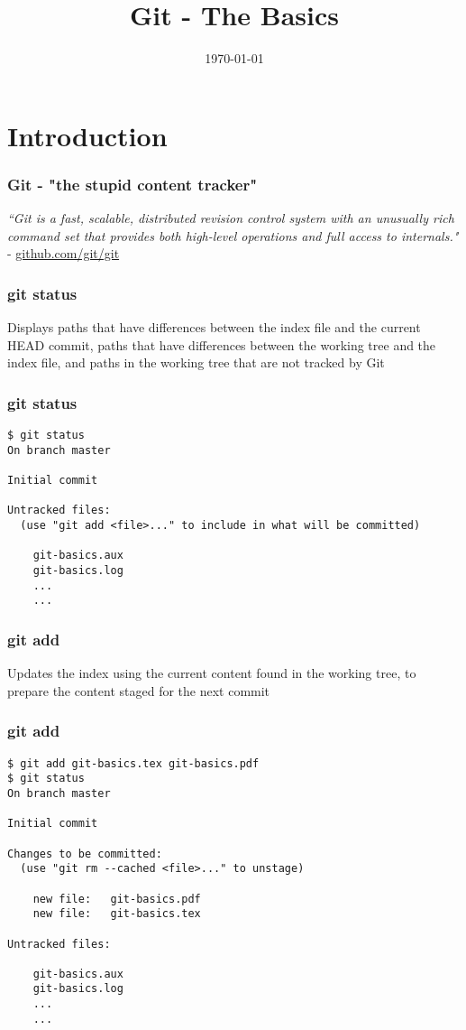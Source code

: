 \documentclass{beamer}
\title[Git]{Git - The Basics} %
\author{} %
\institute[] %
{
 \\ %
\medskip
\textit{chris@cjwfuller.com}
}
\date{\today}
\begin{document}
\begin{frame}
\titlepage
\end{frame}

\section{Introduction}

\begin{frame}
\frametitle{Git - "the stupid content tracker"}
\textit{``Git is a fast, scalable, distributed revision control system with an unusually rich command set that provides both high-level operations and full access to internals."} - \url{github.com/git/git}
\end{frame}


\begin{frame}
\frametitle{git status}
Displays paths that have differences between the index file and the current HEAD commit, paths that have differences between the working tree and the index file, and paths in the working tree that are not tracked by Git
\end{frame}


\begin{frame}[fragile]
\frametitle{git status}
	\scriptsize
	\begin{verbatim}
$ git status
On branch master

Initial commit

Untracked files:
  (use "git add <file>..." to include in what will be committed)

	git-basics.aux
	git-basics.log
	...
	...
	\end{verbatim}
\end{frame}



\begin{frame}
\frametitle{git add}
Updates the index using the current content found in the working tree, to prepare the content staged for the next commit
\end{frame}


\begin{frame}[fragile]
\frametitle{git add}
	\scriptsize
	\begin{verbatim}
$ git add git-basics.tex git-basics.pdf
$ git status
On branch master

Initial commit

Changes to be committed:
  (use "git rm --cached <file>..." to unstage)

	new file:   git-basics.pdf
	new file:   git-basics.tex

Untracked files:

	git-basics.aux
	git-basics.log
	...
	...
	\end{verbatim}
\end{frame}
\end{document}
